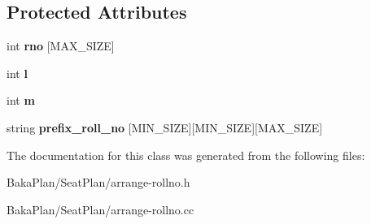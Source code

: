 \subsection*{Protected Attributes}
\begin{DoxyCompactItemize}
\item 
\hypertarget{classArrangeRollNo_acf5d0a49632ff54fcf9281ccfd9c8cd9}{int {\bfseries rno} \mbox{[}M\-A\-X\-\_\-\-S\-I\-Z\-E\mbox{]}}\label{classArrangeRollNo_acf5d0a49632ff54fcf9281ccfd9c8cd9}

\item 
\hypertarget{classArrangeRollNo_a1a1aee004c6072358474336b20fdae27}{int {\bfseries l}}\label{classArrangeRollNo_a1a1aee004c6072358474336b20fdae27}

\item 
\hypertarget{classArrangeRollNo_a626e7c9475affbe5b55d1aa4f69269c7}{int {\bfseries m}}\label{classArrangeRollNo_a626e7c9475affbe5b55d1aa4f69269c7}

\item 
\hypertarget{classArrangeRollNo_a45badfe828041d92fc5d7ad0a5b7ac07}{string {\bfseries prefix\-\_\-roll\-\_\-no} \mbox{[}M\-I\-N\-\_\-\-S\-I\-Z\-E\mbox{]}\mbox{[}M\-I\-N\-\_\-\-S\-I\-Z\-E\mbox{]}\mbox{[}M\-A\-X\-\_\-\-S\-I\-Z\-E\mbox{]}}\label{classArrangeRollNo_a45badfe828041d92fc5d7ad0a5b7ac07}

\end{DoxyCompactItemize}


The documentation for this class was generated from the following files\-:\begin{DoxyCompactItemize}
\item 
Baka\-Plan/\-Seat\-Plan/arrange-\/rollno.\-h\item 
Baka\-Plan/\-Seat\-Plan/arrange-\/rollno.\-cc\end{DoxyCompactItemize}
